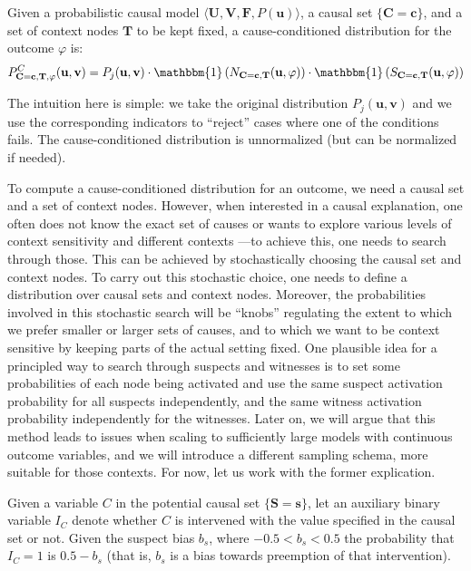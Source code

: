 \documentclass[anon,12pt]{clear2025} %
\begin{document}
\begin{definition}\label{def:cause-conditioned}
    Given a probabilistic causal model \(\langle \mathbf{U}, \mathbf{V}, \mathbf{F}, P(\mathbf{u}) \rangle\), a causal set \(\{\mathbf{C} = \mathbf{c}\}\), and a set of context nodes \(\mathbf{T}\) to be kept fixed, a cause-conditioned distribution for the outcome \(\varphi\) is:
    \[P^C_{\mathbf{C} = \mathbf{c}, \mathbf{T}, \varphi}(\mathbf{u}, \mathbf{v}) = P_j(\mathbf{u}, \mathbf{v}) \cdot \mathbbm{1}\left(N_{\mathbf{C} = \mathbf{c}, \mathbf{T}}(\mathbf{u}, \varphi)\right) \cdot \mathbbm{1}\left(S_{\mathbf{C} = \mathbf{c}, \mathbf{T}}(\mathbf{u}, \varphi)\right)\]
\end{definition}


\noindent The intuition here is simple: we take the original distribution $P_j(\mathbf{u}, \mathbf{v})$ and we use the corresponding indicators to ``reject'' cases where one of the conditions fails.  The cause-conditioned distribution is unnormalized (but can be normalized if needed).


To compute a cause-conditioned distribution for an outcome, we need a causal set and a set of context nodes. However, when interested in a causal explanation, one often does not know the exact set of causes or wants to explore various levels of context sensitivity and different contexts ---to achieve this, one needs to search through those. This can be achieved by stochastically choosing the causal set and context nodes. To carry out this stochastic choice, one needs to define a distribution over causal sets and context nodes. Moreover, the probabilities involved in this stochastic search will be ``knobs'' regulating the extent to which we prefer smaller or larger sets of causes, and to which we want to be context sensitive by keeping parts of the actual setting fixed.
One plausible idea for a principled way to search through suspects and witnesses is to set some probabilities of each node being activated and use the same suspect activation probability for all suspects independently, and the same witness activation probability independently for the witnesses. Later on, we will argue that this method leads to issues when scaling to sufficiently large models with continuous outcome variables, and we will introduce a different sampling schema, more suitable for those contexts. For now, let us work with the former explication.


\begin{definition}
    Given a variable \(C\) in the potential causal set \(\{\mathbf{S} = \mathbf{s}\}\), let an auxiliary binary variable \(I_C\) denote whether \(C\) is intervened with the value specified in the causal set or not. Given the suspect bias \(b_s\), where $-0.5 < b_s < 0.5$ the probability that \(I_C =1\) is \(0.5 - b_s\) (that is, $b_s$ is a bias towards preemption of that intervention).
    
\end{definition}
\end{document}
